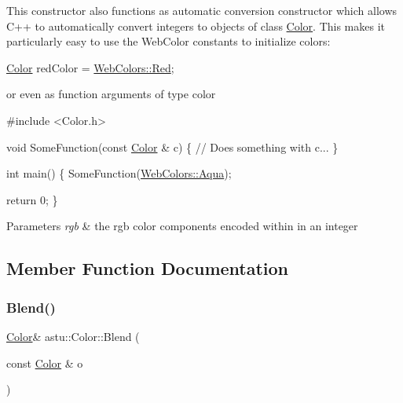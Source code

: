 This constructor also functions as automatic conversion constructor which allows C++ to automatically convert integers to objects of class \hyperlink{classastu_1_1Color}{Color}. This makes it particularly easy to use the Web\+Color constants to initialize colors\+:


\begin{DoxyCode}
\hyperlink{classastu_1_1Color_a3b4505ef24790685a5e22bde22ff5b05}{Color} redColor = \hyperlink{group__gfx__group_gga6f6f9db1751e96b647084ecaedff2409a4f06dbd0c0981a97dd9279788b11a457}{WebColors::Red};
\end{DoxyCode}


or even as function arguments of type color


\begin{DoxyCode}
\textcolor{preprocessor}{#include <Color.h>}

\textcolor{keywordtype}{void} SomeFunction(\textcolor{keyword}{const} \hyperlink{classastu_1_1Color_a3b4505ef24790685a5e22bde22ff5b05}{Color} & c) \{
 \textcolor{comment}{// Does something with c...}
\}

\textcolor{keywordtype}{int} main() \{
  SomeFunction(\hyperlink{group__gfx__group_gga6f6f9db1751e96b647084ecaedff2409a3a60a96de57d7343338c0e5b282add56}{WebColors::Aqua});

  \textcolor{keywordflow}{return} 0;
\}
\end{DoxyCode}



\begin{DoxyParams}{Parameters}
{\em rgb} & the rgb color components encoded within in an integer \\
\hline
\end{DoxyParams}


\subsection{Member Function Documentation}
\mbox{\label{classastu_1_1Color_a3e246cf7b52ffda0f76a4fa0e7810763}} 
\subsubsection{\texorpdfstring{Blend()}{Blend()}}
{\footnotesize\ttfamily \hyperlink{classastu_1_1Color}{Color}\& astu\+::\+Color\+::\+Blend (\begin{DoxyParamCaption}\item[{const \hyperlink{classastu_1_1Color}{Color} \&}]{o }\end{DoxyParamCaption})}

